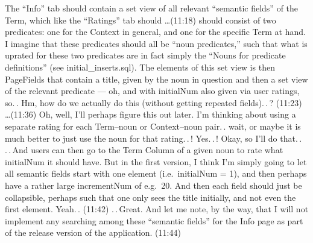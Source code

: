 \documentclass{report}
\begin{document}
The ``Info'' tab should contain a set view of all relevant ``semantic fields'' of the Term, which like the ``Ratings'' tab should %
\ldots (11:18) should consist of two predicates: one for the Context in general, and one for the specific Term at hand. I imagine that these predicates should all be ``noun predicates,'' such that what is uprated for these two predicates are in fact simply the ``Nouns for predicate definitions'' (see initial\_inserts.sql). The elements of this set view is then PageFields that contain a title, given by the noun in question and then a set view of the relevant predicate --- oh, and with initialNum also given via user ratings, so.\,. Hm, how do we actually do this (without getting repeated fields).\,.\,? (11:23)
\ldots (11:36) Oh, well, I'll perhaps figure this out later. I'm thinking about using a separate rating for each Term--noun or Context--noun pair.\,. wait, or maybe it is much better to just use the noun for that rating.\,.\,! Yes.\,.\,! Okay, so I'll do that.\,. .\,.\,And users can then go to the Term Column of a given noun to rate what initialNum it should have. But in the first version, I think I'm simply going to let all semantic fields start with one element (i.e.\ initialNum = 1), and then perhaps have a rather large incrementNum of e.g.\ 20. And then each field should just be collapsible, perhaps such that one only sees the title initially, and not even the first element. Yeah.\,. (11:42) .\,.\,Great. And let me note, by the way, that I will not implement any searching among these ``semantic fields'' for the Info page as part of the release version of the application. (11:44)
\end{document}
